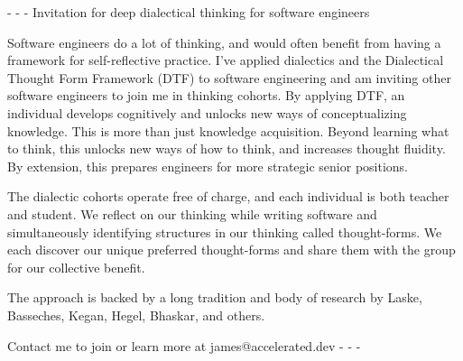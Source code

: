 - - -
Invitation for deep dialectical thinking for software engineers

Software engineers do a lot of thinking, and would often benefit from having a framework for self-reflective practice.
I've applied dialectics and the Dialectical Thought Form Framework (DTF) to software engineering and am inviting other
software engineers to join me in thinking cohorts.
By applying DTF, an individual develops cognitively and unlocks new ways of conceptualizing knowledge.
This is more than just knowledge acquisition.
Beyond learning what to think, this unlocks new ways of how to think, and increases thought fluidity.
By extension, this prepares engineers for more strategic senior positions.

The dialectic cohorts operate  free of charge, and each individual is both teacher and student.
We reflect on our thinking while writing software and simultaneously identifying structures in our thinking called
thought-forms.
We each discover our unique preferred thought-forms and share them with the group for our collective benefit.

The approach is backed by a long tradition and body of research by Laske, Basseches, Kegan, Hegel, Bhaskar,
and others.

Contact me to join or learn more at james@accelerated.dev
- - -